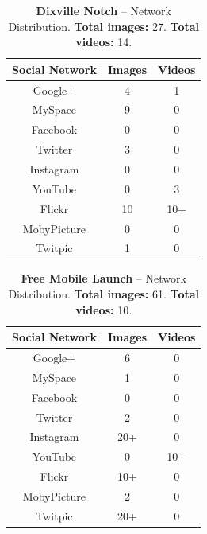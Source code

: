 \documentclass{acm_proc_article-sp}
\begin{document}
\begin{table}[htbp]
  \begin{tabular}{ | c | c | c | }
    \hline
    \textbf{Social Network} & \textbf{Images} & \textbf{Videos}\\
    \hline
    Google+ & 4 & 1\\
    MySpace & 9 & 0\\
    Facebook & 0 & 0\\
    Twitter & 3 & 0\\
    Instagram & 0 & 0\\
    YouTube & 0 & 3\\
    Flickr & 10 & 10+\\ 
    MobyPicture & 0 & 0\\
    Twitpic & 1 & 0\\
    \hline
  \end{tabular}
  \label{tab:dixville}
  \caption{\textbf{Dixville Notch} -- Network Distribution. \textbf{Total images:} 27. \textbf{Total videos:} 14.}
\end{table}

\begin{table}[htbp]
  \begin{tabular}{ | c | c | c | }
    \hline
    \textbf{Social Network} & \textbf{Images} & \textbf{Videos}\\
    \hline
    Google+ & 6 & 0\\
    MySpace & 1 & 0\\
    Facebook & 0 & 0\\
    Twitter & 2 & 0\\
    Instagram & 20+ & 0\\
    YouTube & 0 & 10+\\
    Flickr & 10+ & 0\\ 
    MobyPicture & 2 & 0\\
    Twitpic & 20+ & 0\\
    \hline
  \end{tabular}
  \label{tab:freemobile}
  \caption{\textbf{Free Mobile Launch} -- Network Distribution. \textbf{Total images:} 61. \textbf{Total videos:} 10.}
\end{table}
\end{document}
